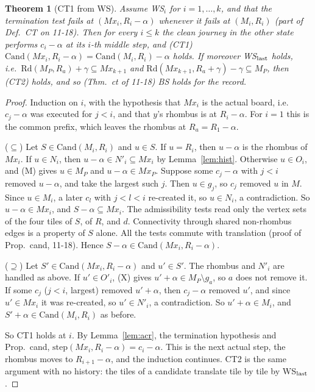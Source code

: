\documentclass[11pt]{article}
\newtheorem{theorem}{Theorem}\newtheorem{lemma}[theorem]{Lemma}\newtheorem{proposition}[theorem]{Proposition}
\theoremstyle{definition}\newtheorem{definition}[theorem]{Definition}\newtheorem{remark}[theorem]{Remark}
\begin{document}
\begin{theorem}[CT1 from WS]\label{thm:red}
Assume WS$_i$ for $i=1,\dots,k$, and that the termination test fails at $(Mx_i,R_i-\alpha)$ whenever it fails at $(M_i,R_i)$ (part of Def.~CT on 11-18). Then for every $i\le k$ the clean journey in the other state performs $c_i-\alpha$ at its $i$-th middle step, and \emph{(CT1)} $\mathrm{Cand}(Mx_i,R_i-\alpha)=\mathrm{Cand}(M_i,R_i)-\alpha$ holds.
If moreover WS$_{\rm last}$ holds, i.e.\ $\mathrm{Rd}(M_P,R_a)+\gamma\subseteq Mx_{k+1}$ and $\mathrm{Rd}(Mx_{k+1},R_a+\gamma)-\gamma\subseteq M_P$, then (CT2) holds, and so (Thm.~ct of 11-18) BS holds for the record.
\end{theorem}
\begin{proof}
Induction on $i$, with the hypothesis that $Mx_i$ is the actual board, i.e.\ $c_j-\alpha$ was executed for $j<i$, and that $y$'s rhombus is at $R_i-\alpha$. For $i=1$ this is the common prefix, which leaves the rhombus at $R_a=R_1-\alpha$.

($\subseteq$) Let $S\in\mathrm{Cand}(M_i,R_i)$ and $u\in S$. If $u=R_i$, then $u-\alpha$ is the rhombus of $Mx_i$. If $u\in N_i$, then $u-\alpha\in N'_i\subseteq Mx_i$ by Lemma~\ref{lem:hist}.
Otherwise $u\in O_i$, and (M) gives $u\in M_P$ and $u-\alpha\in Mx_P$. Suppose some $c_j-\alpha$ with $j<i$ removed $u-\alpha$, and take the largest such $j$. Then $u\in g_j$, so $c_j$ removed $u$ in $M$. Since $u\in M_i$, a later $c_l$ with $j<l<i$ re-created it, so $u\in N_i$, a contradiction. So $u-\alpha\in Mx_i$, and $S-\alpha\subseteq Mx_i$.
The admissibility tests read only the vertex sets of the four tiles of $S$, of $R$, and $d$. Connectivity through shared non-rhombus edges is a property of $S$ alone. All the tests commute with translation (proof of Prop.~cand, 11-18). Hence $S-\alpha\in\mathrm{Cand}(Mx_i,R_i-\alpha)$.

($\supseteq$) Let $S'\in\mathrm{Cand}(Mx_i,R_i-\alpha)$ and $u'\in S'$. The rhombus and $N'_i$ are handled as above. If $u'\in O'_i$, (X) gives $u'+\alpha\in M_P\setminus g_a$, so $a$ does not remove it.
If some $c_j$ ($j<i$, largest) removed $u'+\alpha$, then $c_j-\alpha$ removed $u'$, and since $u'\in Mx_i$ it was re-created, so $u'\in N'_i$, a contradiction. So $u'+\alpha\in M_i$, and $S'+\alpha\in\mathrm{Cand}(M_i,R_i)$ as before.

So CT1 holds at $i$. By Lemma~\ref{lem:acr}, the termination hypothesis and Prop.~cand, $\mathrm{step}(Mx_i,R_i-\alpha)=c_i-\alpha$. This is the next actual step, the rhombus moves to $R_{i+1}-\alpha$, and the induction continues.
CT2 is the same argument with no history: the tiles of a candidate translate tile by tile by WS$_{\rm last}$.
\end{proof}
\end{document}

